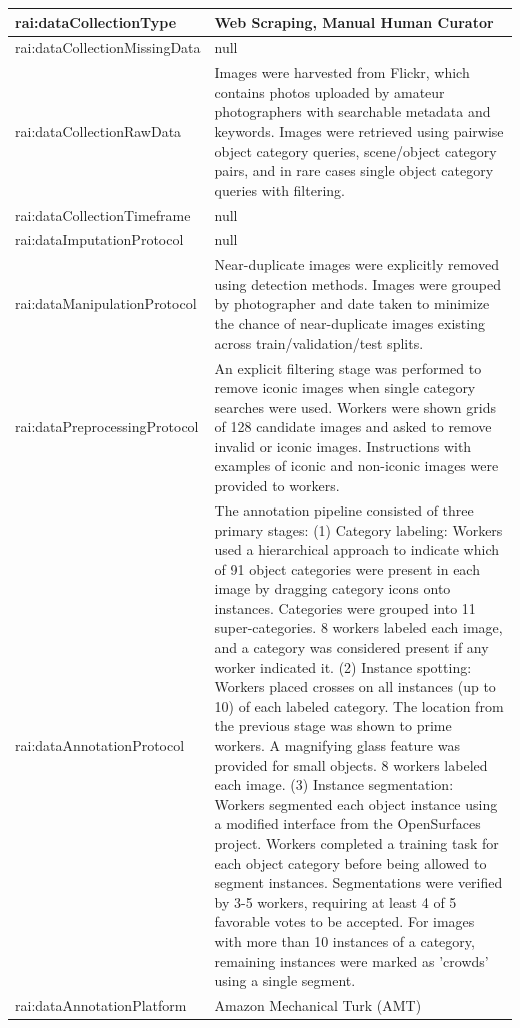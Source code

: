 \documentclass[10pt,a4paper]{article}
\begin{document}
\begin{longtable}{|p{4cm}|p{12cm}|}
\hline
rai:dataCollectionType & Web Scraping, Manual Human Curator \\
\hline
rai:dataCollectionMissingData & null \\
\hline
rai:dataCollectionRawData & Images were harvested from Flickr, which contains photos uploaded by amateur photographers with searchable metadata and keywords. Images were retrieved using pairwise object category queries, scene/object category pairs, and in rare cases single object category queries with filtering. \\
\hline
rai:dataCollectionTimeframe & null \\
\hline
rai:dataImputationProtocol & null \\
\hline
rai:dataManipulationProtocol & Near-duplicate images were explicitly removed using detection methods. Images were grouped by photographer and date taken to minimize the chance of near-duplicate images existing across train/validation/test splits. \\
\hline
rai:dataPreprocessingProtocol & An explicit filtering stage was performed to remove iconic images when single category searches were used. Workers were shown grids of 128 candidate images and asked to remove invalid or iconic images. Instructions with examples of iconic and non-iconic images were provided to workers. \\
\hline
rai:dataAnnotationProtocol & The annotation pipeline consisted of three primary stages: (1) Category labeling: Workers used a hierarchical approach to indicate which of 91 object categories were present in each image by dragging category icons onto instances. Categories were grouped into 11 super-categories. 8 workers labeled each image, and a category was considered present if any worker indicated it. (2) Instance spotting: Workers placed crosses on all instances (up to 10) of each labeled category. The location from the previous stage was shown to prime workers. A magnifying glass feature was provided for small objects. 8 workers labeled each image. (3) Instance segmentation: Workers segmented each object instance using a modified interface from the OpenSurfaces project. Workers completed a training task for each object category before being allowed to segment instances. Segmentations were verified by 3-5 workers, requiring at least 4 of 5 favorable votes to be accepted. For images with more than 10 instances of a category, remaining instances were marked as 'crowds' using a single segment. \\
\hline
rai:dataAnnotationPlatform & Amazon Mechanical Turk (AMT) \\

\end{longtable}
\end{document}
